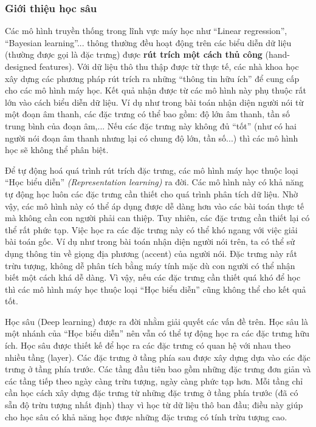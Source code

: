 \subsubsection*{Giới thiệu học sâu}
	Các mô hình truyền thống trong lĩnh vực máy học như ``Linear regression'', ``Bayesian learning''... thông thường đều hoạt động trên các biểu diễn dữ liệu (thường được gọi là đặc trưng) được \textbf{rút trích một cách thủ công} (hand-designed features).
	Với dữ liệu thô thu thập được từ thực tế, các nhà khoa học xây dựng các phương pháp rút trích ra những ``thông tin hữu ích'' để cung cấp cho các mô hình máy học.
	Kết quả nhận được từ các mô hình này phụ thuộc rất lớn vào cách biểu diễn dữ liệu.
	Ví dụ như trong bài toán nhận diện người nói từ một đoạn âm thanh, các đặc trưng có thể bao gồm: độ lớn âm thanh, tần số trung bình của đoạn âm,...
	Nếu các đặc trưng này không đủ ``tốt'' (như có hai người nói đoạn âm thanh nhưng lại có chung độ lớn, tần số...) thì các mô hình học sẽ không thể phân biệt.
		
	Để tự động hoá quá trình rút trích đặc trưng, các mô hình máy học thuộc loại ``Học biểu diễn'' \textit{(Representation learning)} ra đời.
	Các mô hình này có khả năng tự động học luôn các đặc trưng cần thiết cho quá trình phân tích dữ liệu.
	Nhờ vậy, các mô hình này có thể áp dụng được dễ dàng hơn vào các bài toán thực tế mà không cần con người phải can thiệp.
	Tuy nhiên, các đặc trưng cần thiết lại có thể rất phức tạp.
	Việc học ra các đặc trưng này có thể khó ngang với việc giải bài toán gốc.
	Ví dụ như trong bài toán nhận diện người nói trên, ta có thể sử dụng thông tin về giọng địa phương (accent) của người nói.
	Đặc trưng này rất trừu tượng, không dễ phân tích bằng máy tính mặc dù con người có thể nhận biết một cách khá dễ dàng.
	Vì vậy, nếu các đặc trưng cần thiết quá khó để học thì các mô hình máy học thuộc loại ``Học biểu diễn'' cũng không thể cho kết quả tốt.

	Học sâu (Deep learning) được ra đời nhằm giải quyết các vấn đề trên.
	Học sâu là một nhánh của ``Học biểu diễn'' nên vẫn có thể tự động học ra các đặc trưng hữu ích.
	Học sâu được thiết kế để học ra các đặc trưng có quan hệ với nhau theo nhiều tầng (layer).
	Các đặc trưng ở tầng phía sau được xây dựng dựa vào các đặc trưng ở tầng phía trước.
	Các tầng đầu tiên bao gồm những đặc trưng đơn giản và các tầng tiếp theo ngày càng trừu tượng, ngày càng phức tạp hơn.
	Mỗi tầng chỉ cần học cách xây dựng đặc trưng từ những đặc trưng ở tầng phía trước (đã có sẵn độ trừu tượng nhất định) thay vì học từ dữ liệu thô ban đầu; điều này giúp cho học sâu có khả năng học được những đặc trưng có tính trừu tượng cao.
	
